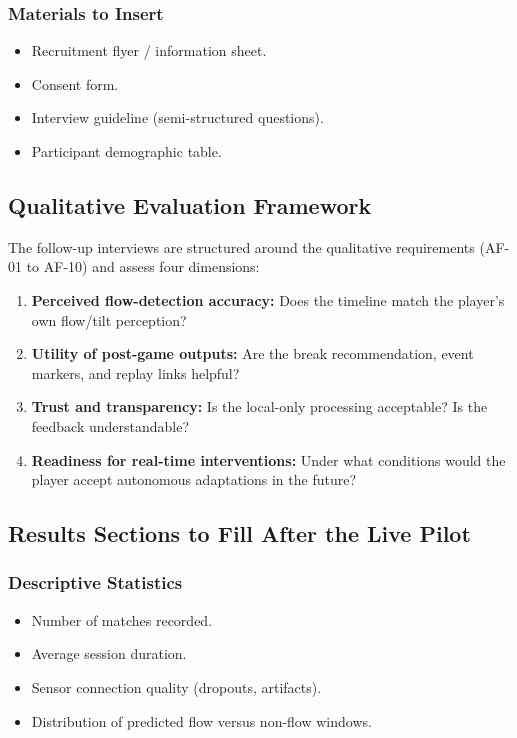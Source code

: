 \subsubsection{Materials to Insert}

\begin{itemize}
    \item Recruitment flyer / information sheet.
    \item Consent form.
    \item Interview guideline (semi-structured questions).
    \item Participant demographic table.
\end{itemize}

\subsection{Qualitative Evaluation Framework}

The follow-up interviews are structured around the qualitative requirements (AF-01 to AF-10) and assess four dimensions:

\begin{enumerate}
    \item \textbf{Perceived flow-detection accuracy:} Does the timeline match the player's own flow/tilt perception?
    \item \textbf{Utility of post-game outputs:} Are the break recommendation, event markers, and replay links helpful?
    \item \textbf{Trust and transparency:} Is the local-only processing acceptable? Is the feedback understandable?
    \item \textbf{Readiness for real-time interventions:} Under what conditions would the player accept autonomous adaptations in the future?
\end{enumerate}

\subsection{Results Sections to Fill After the Live Pilot}

\subsubsection{Descriptive Statistics}

\begin{itemize}
    \item Number of matches recorded.
    \item Average session duration.
    \item Sensor connection quality (dropouts, artifacts).
    \item Distribution of predicted flow versus non-flow windows.
\end{itemize}

